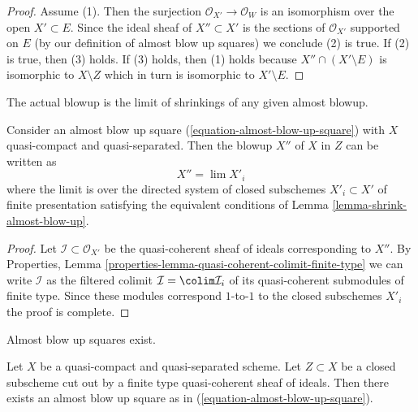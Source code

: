 \begin{proof}
Assume (1). Then the surjection $\mathcal{O}_{X'} \to \mathcal{O}_W$
is an isomorphism over the open $X' \subset E$. Since the ideal sheaf
of $X'' \subset X'$ is the sections of $\mathcal{O}_{X'}$ supported on $E$
(by our definition of almost blow up squares)
we conclude (2) is true. If (2) is true, then (3) holds.
If (3) holds, then (1) holds because $X'' \cap (X' \setminus E)$
is isomorphic to $X \setminus Z$ which in turn is isomorphic
to $X' \setminus E$.
\end{proof}

\noindent
The actual blowup is the limit of shrinkings of any given almost blowup.

\begin{lemma}
\label{lemma-blow-up-limit-almost-blow-up}
Consider an almost blow up square (\ref{equation-almost-blow-up-square})
with $X$ quasi-compact and quasi-separated. Then the blowup $X''$ of $X$
in $Z$ can be written as
$$
X'' = \lim X'_i
$$
where the limit is over the directed system of closed subschemes
$X'_i \subset X'$ of finite presentation satisfying the equivalent
conditions of Lemma \ref{lemma-shrink-almost-blow-up}.
\end{lemma}

\begin{proof}
Let $\mathcal{I} \subset \mathcal{O}_{X'}$ be the quasi-coherent
sheaf of ideals corresponding to $X''$. By
Properties, Lemma \ref{properties-lemma-quasi-coherent-colimit-finite-type}
we can write $\mathcal{I}$ as the filtered colimit
$\mathcal{I} = \colim \mathcal{I}_i$ of its quasi-coherent
submodules of finite type. Since these modules correspond
$1$-to-$1$ to the closed subschemes $X'_i$ the proof is complete.
\end{proof}

\noindent
Almost blow up squares exist.

\begin{lemma}
\label{lemma-almost-blow-up-square}
Let $X$ be a quasi-compact and quasi-separated scheme. Let $Z \subset X$
be a closed subscheme cut out by a finite type quasi-coherent
sheaf of ideals. Then there exists an almost blow up square as in
(\ref{equation-almost-blow-up-square}).
\end{lemma}


